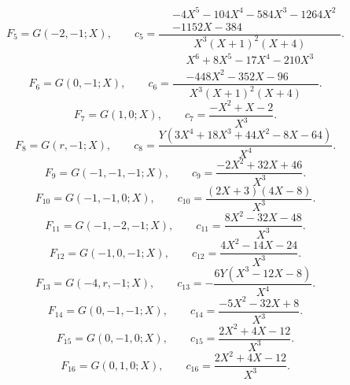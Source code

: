 \begin{equation}
 F_{5}=G(-2,-1;X),\qquad c_{5}=\frac{\begin{aligned}&- 4 X^{5} - 104 X^{4} - 584 X^{3} - 1264 X^{2}\\&- 1152 X - 384\end{aligned}}{X^{3} \left(X + 1\right)^{2} \left(X + 4\right)}.
\end{equation}
\begin{equation}
 F_{6}=G(0,-1;X),\qquad c_{6}=\frac{\begin{aligned}&X^{6} + 8 X^{5} - 17 X^{4} - 210 X^{3}\\&- 448 X^{2} - 352 X - 96\end{aligned}}{X^{3} \left(X + 1\right)^{2} \left(X + 4\right)}.
\end{equation}
\begin{equation}
 F_{7}=G(1,0;X),\qquad c_{7}=\frac{- X^{2} + X - 2}{X^{3}}.
\end{equation}
\begin{equation}
 F_{8}=G(r,-1;X),\qquad c_{8}=\frac{Y \left(3 X^{4} + 18 X^{3} + 44 X^{2} - 8 X - 64\right)}{X^{4}}.
\end{equation}
\begin{equation}
 F_{9}=G(-1,-1,-1;X),\qquad c_{9}=\frac{- 2 X^{2} + 32 X + 46}{X^{3}}.
\end{equation}
\begin{equation}
 F_{10}=G(-1,-1,0;X),\qquad c_{10}=\frac{\left(2 X + 3\right) \left(4 X - 8\right)}{X^{3}}.
\end{equation}
\begin{equation}
 F_{11}=G(-1,-2,-1;X),\qquad c_{11}=\frac{8 X^{2} - 32 X - 48}{X^{3}}.
\end{equation}
\begin{equation}
 F_{12}=G(-1,0,-1;X),\qquad c_{12}=\frac{4 X^{2} - 14 X - 24}{X^{3}}.
\end{equation}
\begin{equation}
 F_{13}=G(-4,r,-1;X),\qquad c_{13}=- \frac{6 Y \left(X^{3} - 12 X - 8\right)}{X^{4}}.
\end{equation}
\begin{equation}
 F_{14}=G(0,-1,-1;X),\qquad c_{14}=\frac{- 5 X^{2} - 32 X + 8}{X^{3}}.
\end{equation}
\begin{equation}
 F_{15}=G(0,-1,0;X),\qquad c_{15}=\frac{2 X^{2} + 4 X - 12}{X^{3}}.
\end{equation}
\begin{equation}
 F_{16}=G(0,1,0;X),\qquad c_{16}=\frac{2 X^{2} + 4 X - 12}{X^{3}}.
\end{equation}
